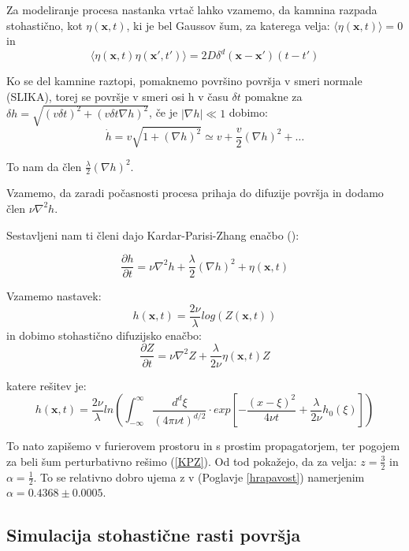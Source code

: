 \documentclass[a4paper, oneside, 12pt]{book}
\begin{document}
            Za modeliranje procesa nastanka vrtač lahko vzamemo, da kamnina razpada stohastično, kot $\eta(\mathbf{x},t)$, ki je bel Gaussov šum, za katerega velja: $ \langle \eta(\mathbf{x},t) \rangle=0 $ in
            \[ \langle \eta(\mathbf{x},t) \eta(\mathbf{x'},t')\rangle = 2 D \delta^d(\mathbf{x}-\mathbf{x'})(t-t') \]

            Ko se del kamnine raztopi, pomaknemo površino površja v smeri normale (SLIKA), torej se površje v smeri osi h v času $\delta t$ pomakne za $\delta h = \sqrt{ (v \delta t)^2 + (v \delta t \nabla h)^2}$, če je $|\nabla h| \ll 1$ dobimo: 
            \[ \dot h = v \sqrt{1 + (\nabla h)^2} \simeq v + \frac{v}{2} (\nabla h)^2 + \ldots \] 

            To nam da člen $\frac{\lambda}{2} (\nabla h)^2$.

            Vzamemo, da zaradi počasnosti procesa prihaja do difuzije površja in dodamo člen $\nu \nabla^2 h$.

            Sestavljeni nam ti členi dajo Kardar-Parisi-Zhang enačbo (\cite{kardar1986dynamic}):

            \begin{equation}
              \frac{\partial h}{\partial t} = \nu \nabla^2 h + \frac{\lambda}{2} (\nabla h)^2 + \eta (\mathbf{x},t)
              \label{KPZ}
            \end{equation}

            Vzamemo nastavek: 
            \[ h(\mathbf{x},t) = \frac{2 \nu}{\lambda} log(Z(\mathbf{x},t)) \]
            in dobimo stohastično difuzijsko enačbo:
            \[ \frac{\partial Z}{\partial t} = \nu \nabla^2 Z + \frac{\lambda}{2 \nu} \eta(\mathbf{x},t) Z \]

            katere rešitev je:
            \[ h(\mathbf{x},t) = \frac{2 \nu}{\lambda} ln \left( \int_{-\infty}^{\infty} \frac{d^d \xi}{(4 \pi \nu t)^{d/2}} \cdot exp[-\frac{(x-\xi)^2}{4 \nu t} + \frac{\lambda}{2 \nu}h_0(\xi)] \right) \]

            To nato zapišemo v furierovem prostoru in s prostim propagatorjem, ter pogojem za beli šum perturbativno rešimo (\ref{KPZ}). Od tod \cite{kardar1986dynamic} pokažejo, da za velja: $z = \frac{3}{2}$ in $\alpha=\frac{1}{2}$. To se relativno dobro ujema z v (Poglavje \ref{hrapavost}) namerjenim $\alpha=0.4368 \pm 0.0005$.


            \subsection{Simulacija stohastične rasti površja}
\end{document}
